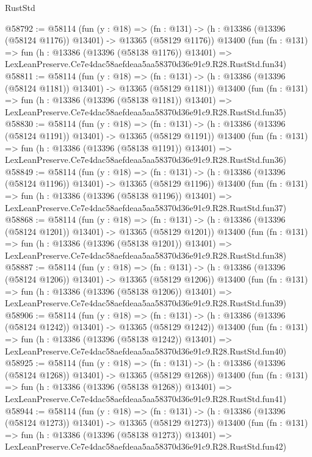 \begin{lexlean}{RustStd}
\begin{coremodule}
@58792 := @58114
    (fun (y : @18) =>
    (fn : @131) -> (h : @13386 (@13396 (@58124 @1176)) @13401) -> @13365 (@58129 @1176))
    @13400
    (fun (fn : @131) =>
    fun (h : @13386 (@13396 (@58138 @1176)) @13401) =>
    LexLeanPreserve.Ce7e4dac58aefdeaa5aa58370d36e91c9.R28.RustStd.fun34)
@58811 := @58114
    (fun (y : @18) =>
    (fn : @131) -> (h : @13386 (@13396 (@58124 @1181)) @13401) -> @13365 (@58129 @1181))
    @13400
    (fun (fn : @131) =>
    fun (h : @13386 (@13396 (@58138 @1181)) @13401) =>
    LexLeanPreserve.Ce7e4dac58aefdeaa5aa58370d36e91c9.R28.RustStd.fun35)
@58830 := @58114
    (fun (y : @18) =>
    (fn : @131) -> (h : @13386 (@13396 (@58124 @1191)) @13401) -> @13365 (@58129 @1191))
    @13400
    (fun (fn : @131) =>
    fun (h : @13386 (@13396 (@58138 @1191)) @13401) =>
    LexLeanPreserve.Ce7e4dac58aefdeaa5aa58370d36e91c9.R28.RustStd.fun36)
@58849 := @58114
    (fun (y : @18) =>
    (fn : @131) -> (h : @13386 (@13396 (@58124 @1196)) @13401) -> @13365 (@58129 @1196))
    @13400
    (fun (fn : @131) =>
    fun (h : @13386 (@13396 (@58138 @1196)) @13401) =>
    LexLeanPreserve.Ce7e4dac58aefdeaa5aa58370d36e91c9.R28.RustStd.fun37)
@58868 := @58114
    (fun (y : @18) =>
    (fn : @131) -> (h : @13386 (@13396 (@58124 @1201)) @13401) -> @13365 (@58129 @1201))
    @13400
    (fun (fn : @131) =>
    fun (h : @13386 (@13396 (@58138 @1201)) @13401) =>
    LexLeanPreserve.Ce7e4dac58aefdeaa5aa58370d36e91c9.R28.RustStd.fun38)
@58887 := @58114
    (fun (y : @18) =>
    (fn : @131) -> (h : @13386 (@13396 (@58124 @1206)) @13401) -> @13365 (@58129 @1206))
    @13400
    (fun (fn : @131) =>
    fun (h : @13386 (@13396 (@58138 @1206)) @13401) =>
    LexLeanPreserve.Ce7e4dac58aefdeaa5aa58370d36e91c9.R28.RustStd.fun39)
@58906 := @58114
    (fun (y : @18) =>
    (fn : @131) -> (h : @13386 (@13396 (@58124 @1242)) @13401) -> @13365 (@58129 @1242))
    @13400
    (fun (fn : @131) =>
    fun (h : @13386 (@13396 (@58138 @1242)) @13401) =>
    LexLeanPreserve.Ce7e4dac58aefdeaa5aa58370d36e91c9.R28.RustStd.fun40)
@58925 := @58114
    (fun (y : @18) =>
    (fn : @131) -> (h : @13386 (@13396 (@58124 @1268)) @13401) -> @13365 (@58129 @1268))
    @13400
    (fun (fn : @131) =>
    fun (h : @13386 (@13396 (@58138 @1268)) @13401) =>
    LexLeanPreserve.Ce7e4dac58aefdeaa5aa58370d36e91c9.R28.RustStd.fun41)
@58944 := @58114
    (fun (y : @18) =>
    (fn : @131) -> (h : @13386 (@13396 (@58124 @1273)) @13401) -> @13365 (@58129 @1273))
    @13400
    (fun (fn : @131) =>
    fun (h : @13386 (@13396 (@58138 @1273)) @13401) =>
    LexLeanPreserve.Ce7e4dac58aefdeaa5aa58370d36e91c9.R28.RustStd.fun42)

\end{coremodule}
\end{lexlean}
